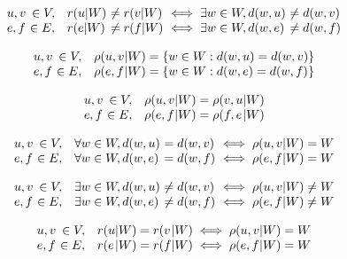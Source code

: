 \begin{corollary}
	\[\begin{array}{l@{\ }r l@{\ }l@{\ }l@{\ }l}
		u, v &\in V, & r(u|W) &\neq r(v|W) &\iff \exists w \in W, d(w,u) &\neq d(w,v) \\
		e, f &\in E, & r(e|W) &\neq r(f|W) &\iff \exists w \in W, d(w,e) &\neq d(w,f)
	\end{array}\]
\end{corollary}

\begin{definition}
	\[\begin{array}{l@{\ }r l@{}l@{}l}
		u, v &\in V, & \rho(u,v&|W) = \{w \in W : d(w,u) = d(w,v)&\} \\
		e, f &\in E, & \rho(e,f&|W) = \{w \in W : d(w,e) = d(w,f)&\}
	\end{array}\]
\end{definition}

\begin{remark}
	\[\begin{array}{l@{\ }r l@{}l@{}l}
		u, v &\in V, & \rho(u,v&|W) = \rho(v,u&|W) \\
		e, f &\in E, & \rho(e,f&|W) = \rho(f,e&|W)
	\end{array}\]
\end{remark}

\begin{lemma}
	\[\begin{array}{l@{\ }r l@{\ }l@{\ }l@{}l}
		u, v &\in V, & \forall w \in W, d(w,u) &= d(w,v) &\iff \rho(u,v&|W) = W \\
		e, f &\in E, & \forall w \in W, d(w,e) &= d(w,f) &\iff \rho(e,f&|W) = W
	\end{array}\]
\end{lemma}

\begin{corollary}
	\[\begin{array}{l@{\ }r l@{\ }l@{\ }l@{}l}
		u, v &\in V, & \exists w \in W, d(w,u) &\neq d(w,v) &\iff \rho(u,v&|W) \neq W \\
		e, f &\in E, & \exists w \in W, d(w,e) &\neq d(w,f) &\iff \rho(e,f&|W) \neq W
	\end{array}\]
\end{corollary}

\begin{corollary}
	\[\begin{array}{l@{\ }r l@{}l@{}l@{}l}
		u, v &\in V, & r(u&|W) = r(v&|W) \iff \rho(u,v&|W) = W \\
		e, f &\in E, & r(e&|W) = r(f&|W) \iff \rho(e,f&|W) = W
	\end{array}\]
\end{corollary}

